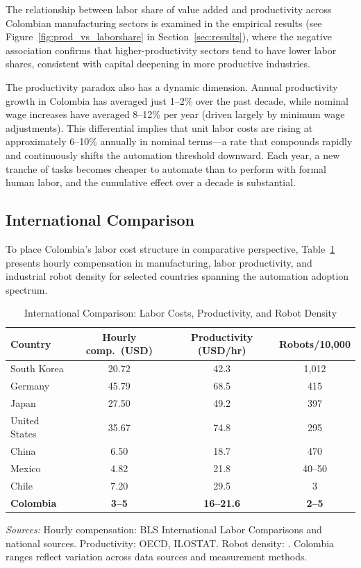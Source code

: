 \documentclass{article}
\begin{document}
The relationship between labor share of value added and productivity across Colombian manufacturing sectors is examined in the empirical results (see Figure~\ref{fig:prod_vs_laborshare} in Section~\ref{sec:results}), where the negative association confirms that higher-productivity sectors tend to have lower labor shares, consistent with capital deepening in more productive industries.

The productivity paradox also has a dynamic dimension. Annual productivity growth in Colombia has averaged just 1--2\% over the past decade, while nominal wage increases have averaged 8--12\% per year (driven largely by minimum wage adjustments). This differential implies that unit labor costs are rising at approximately 6--10\% annually in nominal terms---a rate that compounds rapidly and continuously shifts the automation threshold downward. Each year, a new tranche of tasks becomes cheaper to automate than to perform with formal human labor, and the cumulative effect over a decade is substantial.

\subsection{International Comparison}
\label{subsec:international_comparison}

To place Colombia's labor cost structure in comparative perspective, Table~\ref{tab:international_comparison} presents hourly compensation in manufacturing, labor productivity, and industrial robot density for selected countries spanning the automation adoption spectrum.

\begin{table}[htbp]
\centering
\caption{International Comparison: Labor Costs, Productivity, and Robot Density}
\label{tab:international_comparison}
\begin{threeparttable}
\begin{tabular}{lccc}
\toprule
\textbf{Country} & \textbf{Hourly comp.\ (USD)} & \textbf{Productivity (USD/hr)} & \textbf{Robots/10,000} \\
\midrule
South Korea & 20.72 & 42.3 & 1,012 \\
Germany & 45.79 & 68.5 & 415 \\
Japan & 27.50 & 49.2 & 397 \\
United States & 35.67 & 74.8 & 295 \\
China & 6.50 & 18.7 & 470 \\
Mexico & 4.82 & 21.8 & 40--50 \\
Chile & 7.20 & 29.5 & 3 \\
\textbf{Colombia} & \textbf{3--5} & \textbf{16--21.6} & \textbf{2--5} \\
\bottomrule
\end{tabular}
\begin{tablenotes}
\small
\item \textit{Sources:} Hourly compensation: BLS International Labor Comparisons and national sources. Productivity: OECD, ILOSTAT. Robot density: \cite{ifr2024}. Colombia ranges reflect variation across data sources and measurement methods.
\end{tablenotes}
\end{threeparttable}
\end{table}
\end{document}
